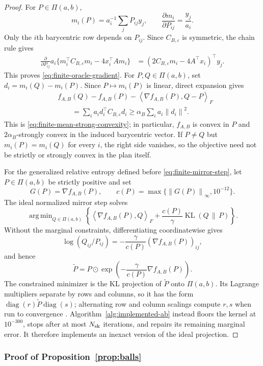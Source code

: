 \documentclass[11pt]{article}
\newcommand{\ip}[2]{\left\langle #1,#2\right\rangle}
\newcommand{\norm}[1]{\left\lVert #1\right\rVert}
\DeclareMathOperator{\KL}{KL}
\DeclareMathOperator*{\argmin}{arg\,min}
\theoremstyle{plain}
\theoremstyle{definition}
\theoremstyle{remark}
\begin{document}
\begin{proof}
For $P\in\Pi(a,b)$,
\[
 m_i(P)=a_i^{-1}\sum_jP_{ij}y_j,\qquad
 \frac{\partial m_i}{\partial P_{ij}}=\frac{y_j}{a_i}.
\]
Only the $i$th barycentric row depends on $P_{ij}$.  Since
$C_{B,\varepsilon}$ is symmetric, the chain rule gives
\begin{align*}
 \frac{\partial}{\partial P_{ij}}
 a_i\{m_i^\top C_{B,\varepsilon}m_i-4x_i^\top A m_i\}
 &=(2C_{B,\varepsilon}m_i-4A^\top x_i)^\top y_j.
\end{align*}
This proves \eqref{eq:finite-oracle-gradient}. For $P,Q\in\Pi(a,b)$, set
$d_i=m_i(Q)-m_i(P)$. Since $P\mapsto m_i(P)$ is linear, direct expansion gives
\begin{align*}
 &f_{A,B}(Q)-f_{A,B}(P)-\ip{\nabla f_{A,B}(P)}{Q-P}_F\\
 &\qquad=\sum_i a_i d_i^\top C_{B,\varepsilon}d_i
 \ge\alpha_B\sum_i a_i\norm{d_i}^2.
\end{align*}
This is \eqref{eq:finite-mean-strong-convexity}; in particular, $f_{A,B}$ is
convex in $P$ and $2\alpha_B$-strongly convex in the induced barycentric vector.
If $P\ne Q$ but $m_i(P)=m_i(Q)$ for every $i$, the right side vanishes, so the
objective need not be strictly or strongly convex in the plan itself.

For the generalized relative entropy defined before
\eqref{eq:finite-mirror-step}, let \(P\in\Pi(a,b)\) be strictly positive and
set
\[
 G(P)=\nabla f_{A,B}(P),\qquad
 c(P)=\max\{\norm{G(P)}_\infty,10^{-12}\}.
\]
The ideal normalized mirror step solves
\[
 \argmin_{Q\in\Pi(a,b)}
 \left\{\ip{\nabla f_{A,B}(P)}Q_F+
 \frac{c(P)}{\gamma}\KL(Q\,\|\,P)\right\}.
\]
Without the marginal constraints, differentiating coordinatewise gives
\[
 \log(Q_{ij}/P_{ij})
 =-\frac{\gamma}{c(P)}(\nabla f_{A,B}(P))_{ij},
\]
and hence
\[
 \widetilde P
 =P\odot\exp\!\left(-\frac{\gamma}{c(P)}\nabla f_{A,B}(P)\right).
\]
The constrained minimizer is the KL projection of $\widetilde P$ onto
$\Pi(a,b)$.  Its Lagrange multipliers separate by rows and columns, so it has the
form $\operatorname{diag}(r)\widetilde P\operatorname{diag}(s)$; alternating
row and column scalings compute $r,s$ when run to convergence
\cite[Section~4.2]{PeyreCuturiOT}. Algorithm~\ref{alg:implemented-ab} instead
floors the kernel at \(10^{-300}\), stops after at most \(N_{\rm sk}\)
iterations, and repairs its remaining marginal error. It therefore implements
an inexact version of the ideal projection.
\end{proof}

\subsubsection{Proof of Proposition~\ref{prop:balls}}\label{proof:11.2}
\end{document}
